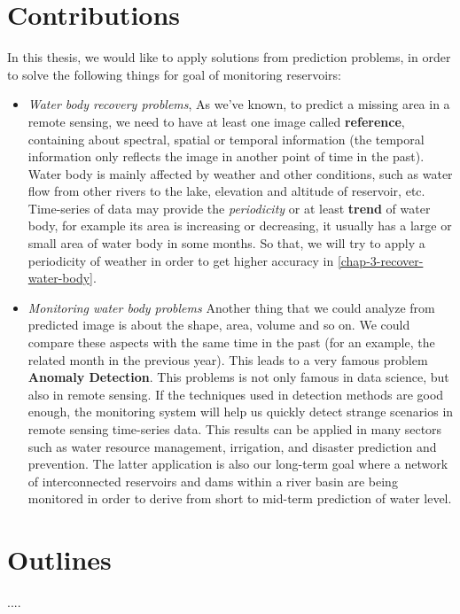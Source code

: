 \section{Contributions} %

In this thesis, we would like to apply solutions from prediction problems, in order to solve the following things for goal of monitoring reservoirs:

\begin{itemize}
	\item \textit{Water body recovery problems}, As we've known, to predict a missing area in a remote sensing, we need to have at least one image called \textbf{reference}, containing about spectral, spatial or temporal information  (the temporal information only reflects the image in another point of time in the past). Water body is mainly affected by weather and other conditions, such as water flow from other rivers to the lake, elevation and altitude of reservoir, etc. Time-series of data may provide the \textit{periodicity} or at least \textbf{trend} of water body, for example its area is increasing or decreasing, it usually has a large or small area of water body in some months. So that, we will try to apply a periodicity of weather in order to get higher accuracy in \ref{chap-3-recover-water-body}.

	\item \textit{Monitoring water body problems} Another thing that we could analyze from predicted image is about the shape, area, volume and so on. We could compare these aspects with the same time in the past (for an example, the related month in the previous year). This leads to a very famous problem \textbf{Anomaly Detection}. This problems is not only famous in data science, but also in remote sensing\cite{Grosklos2015,Yang2019}. If the techniques used in detection methods are good enough, the monitoring system will help us quickly detect strange scenarios in remote sensing time-series data. This results can be applied in many sectors such as water resource management, irrigation, and disaster prediction and prevention. The latter application is also our long-term goal where a network of interconnected reservoirs and dams  within a river basin are being monitored in order to derive from short to mid-term prediction of water level.
\end{itemize}


\section{Outlines} 

.... 
